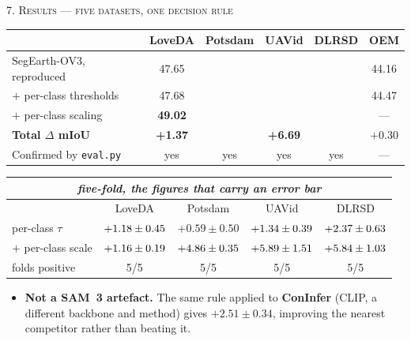 \documentclass[aspectratio=169]{beamer}
\newcommand{\best}[1]{\textcolor{acc}{\textbf{#1}}}
\newcommand{\ok}[1]{\textcolor{good}{#1}}
\begin{document}
\begin{frame}{\textsc{7. Results --- five datasets, one decision rule}}
\vspace{-0.2em}
\begin{center}\footnotesize
\renewcommand{\arraystretch}{1.2}
\begin{tabular}{@{}lccccc@{}}
\toprule
& \textbf{LoveDA} & \textbf{Potsdam} & \textbf{UAVid} & \textbf{DLRSD} & \textbf{OEM} \\
\midrule
SegEarth-OV3, reproduced & 47.65 & \eePotsA{} & \uavBase{} & \dlrEEa{} & 44.16 \\
\;$+$ per-class thresholds & 47.68 & \eePotsB{} & \uavEEone{} & \dlrEEb{} & 44.47 \\
\;$+$ per-class scaling & \best{49.02} & \best{\eePotsC{}} & \best{\uavEEtwo{}} & \best{\dlrEEc{}} & --- \\
\midrule
\textbf{Total $\Delta$ mIoU} & \best{+1.37} & \best{\potsTotal{}} & \best{+6.69} & \best{\dlrTotal{}} & $+0.30$ \\
Confirmed by \texttt{eval.py} & \ok{yes} & \ok{yes} & \ok{yes} & \ok{yes} & --- \\
\bottomrule
\end{tabular}
\end{center}
\vspace{0.3em}
\begin{center}\footnotesize
\begin{tabular}{@{}lcccc@{}}
\multicolumn{5}{c}{\textit{five-fold, the figures that carry an error bar}}\\
\toprule
& LoveDA & Potsdam & UAVid & DLRSD \\
\midrule
per-class $\tau$ & $+1.18{} \pm 0.45$ & $+0.59 \pm 0.50$ & $+1.34{} \pm 0.39$ & $+2.37{} \pm 0.63{}$\\
$+$ per-class scale & $+1.16{} \pm 0.19{}$ & $+4.86{} \pm 0.35{}$ & $+5.89{} \pm 1.51$ & $+5.84{} \pm 1.03{}$\\
folds positive & \ok{5/5} & \ok{5/5} & \ok{5/5} & \ok{5/5}\\
\bottomrule
\end{tabular}
\end{center}
\vspace{0.4em}
\footnotesize
\begin{itemize}\footnotesize
  \item \textbf{Not a SAM~3 artefact.} The same rule applied to \best{ConInfer}
        (CLIP, a different backbone and method) gives \best{$+2.51 \pm 0.34$},
        improving the nearest competitor rather than beating it.

\end{itemize}
\end{frame}
\end{document}
